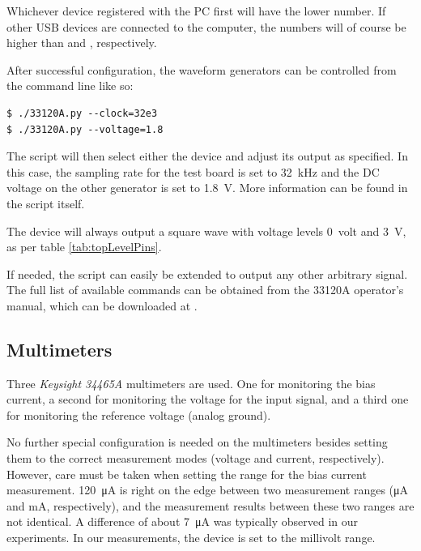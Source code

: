 Whichever  device   registered  with  the   PC  first  will  have   the  lower
 number. If other  USB devices are connected  to the computer,
the numbers will of course be higher than  and , respectively.

After successful configuration, the waveform generators can be controlled from
the command line like so\footnotemark:

\begin{verbatim}
$ ./33120A.py --clock=32e3
$ ./33120A.py --voltage=1.8
\end{verbatim}

The script will then select either the   device
and adjust  its output as specified. In  this case, the sampling  rate for the
test board  is set  to \SI{32}{\kilo\hertz}  and the DC  voltage on  the other
generator  is set  to \SI{1.8}{\volt}. More  information can  be found  in the
script itself.

The  device  will always output a square wave  with voltage levels
\SI{0}{volt} and \SI{3}{\volt}, as per table \ref{tab:topLevelPins}.

If needed,  the script can  easily be extended  to output any  other arbitrary
signal. The full  list of available commands  can be obtained from  the 33120A
operator's manual, which can be downloaded at \cite{ref:33120A:userGuide}.



\subsection{Multimeters}
\label{subsec:34465A}

Three \emph{Keysight 34465A} multimeters are used. One for monitoring the bias
current, a second for monitoring the voltage for the input signal, and a third
one for monitoring the reference voltage (analog ground).

No  further  special  configuration  is  needed  on  the  multimeters  besides
setting  them  to   the  correct  measurement  modes   (voltage  and  current,
respectively). However, care must be taken when setting the range for the bias
current measurement. \SI{120}{\micro\ampere} is right  on the edge between two
measurement ranges (\si{\micro\ampere}  and \si{\milli\ampere}, respectively),
and  the measurement  results between  these two  ranges are  not identical. A
difference  of  about  \SI{7}{\micro\ampere}  was typically  observed  in  our
experiments. In our measurements, the device is set to the millivolt range.

